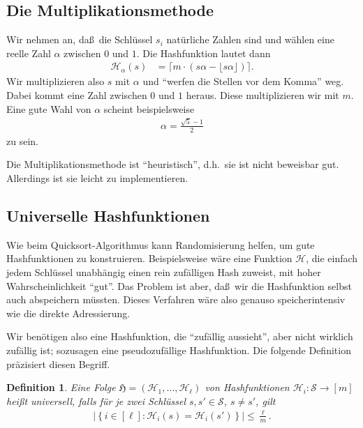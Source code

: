 \documentclass[10pt,reqno]{amsart}
\numberwithin{equation}{section}
\newcommand\cH{\mathcal H}
\newcommand\cS{\mathcal S}
\newcommand\fH{\mathfrak H}
\newtheorem{definition}{Definition}[section]
\newcommand\cbc[1]{\left\{{#1}\right\}}
\newcommand\abs[1]{\left|{#1}\right|}
\begin{document}
\subsection{Die Multiplikationsmethode}\label{sec_hash_mult}
Wir nehmen an, da\ss\ die Schl\"ussel $s_i$ nat\"urliche Zahlen sind und w\"ahlen eine reelle Zahl $\alpha$ zwischen $0$ und $1$.
Die Hashfunktion lautet dann
	\begin{align*}
		\cH_\alpha(s)&=\lceil m \cdot (s\alpha-\lfloor s\alpha\rfloor)\rceil.
	\end{align*}
Wir multiplizieren also $s$ mit $\alpha$ und ``werfen die Stellen vor dem Komma'' weg.
Dabei kommt eine Zahl zwischen $0$ und $1$ heraus.
Diese multiplizieren wir mit $m$.
Eine gute Wahl von $\alpha$ scheint beispielsweise
\begin{align*}
	\alpha=\frac{\sqrt 5-1}2
\end{align*}
zu sein.

Die Multiplikationsmethode ist ``heuristisch'', d.h.\ sie ist nicht beweisbar gut.
Allerdings ist sie leicht zu implementieren.

\subsection{Universelle Hashfunktionen}\label{sec_universal}
Wie beim Quicksort-Algorithmus kann Randomisierung helfen, um gute Hashfunktionen zu konstruieren.
Beispielsweise w\"are eine Funktion $\cH$, die einfach jedem Schl\"ussel unabh\"angig einen rein zuf\"alligen Hash zuweist, mit hoher Wahrscheinlichkeit ``gut''.
Das Problem ist aber, da\ss\ wir die Hashfunktion selbst auch abspeichern m\"ussten.
Dieses Verfahren w\"are also genauso speicherintensiv wie die direkte Adressierung.

Wir ben\"otigen also eine Hashfunktion, die ``zuf\"allig aussieht'', aber nicht wirklich zuf\"allig ist; sozusagen eine pseudozuf\"allige Hashfunktion.
Die folgende Definition pr\"azisiert diesen Begriff.

\begin{definition}\label{def_hash}
	Eine Folge $\fH=(\cH_1,\ldots,\cH_\ell)$ von Hashfunktionen $\cH_i:\cS\to[m]$ hei\ss t {\em universell}, falls f\"ur je zwei Schl\"ussel $s,s'\in\cS$, $s\neq s'$, gilt
	\begin{align}\label{eqdef_hash}
		\abs{\cbc{i\in[\ell]:\cH_i(s)=\cH_i(s')}}\leq\frac\ell m.
	\end{align}
\end{definition}
\end{document}
